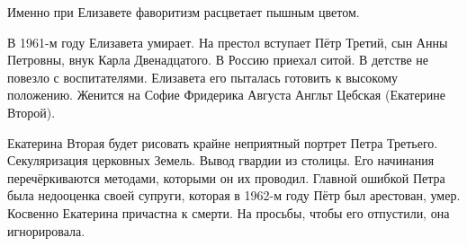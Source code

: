 Именно при Елизавете фаворитизм расцветает пышным цветом.

В 1961-м году Елизавета умирает. На престол вступает Пётр Третий, сын Анны Петровны, внук Карла Двенадцатого. В Россию приехал ситой. В детстве не повезло с воспитателями. Елизавета его пыталась готовить к высокому положению. Женится на Софие Фридерика Августа Англьт Цебская (Екатерине Второй). 

Екатерина Вторая будет рисовать крайне неприятный портрет Петра Третьего. 
Секуляризация церковных Земель. Вывод гвардии из столицы. Его начинания перечёркиваются методами, которыми он их проводил. Главной ошибкой Петра была недооценка своей супруги, которая в 1962-м году Пётр был арестован, умер. Косвенно Екатерина причастна к смерти. На просьбы, чтобы его отпустили, она игнорировала.
